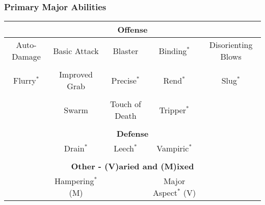 \subsubsection{Primary Major Abilities}
\begin{tabular}{|c c c c c|}
\hline
\multicolumn{5}{|c|}{\cellcolor{gray}\textbf{Offense}} \\
\hline
Auto-Damage & Basic Attack & Blaster & Binding$^\ast $  & Disorienting Blows \\
 & & & & \\
Flurry$^\ast $  & Improved Grab & Precise$^\ast $  & Rend$^\ast $  & Slug$^\ast $  \\
 & & & & \\
 & Swarm & Touch of Death & Tripper$^\ast $ & \\
\hline
\multicolumn{5}{c}{ }\\
\hline
\multicolumn{5}{|c|}{\cellcolor{gray}\textbf{Defense}} \\
\hline
 & Drain$^\ast $ & Leech$^\ast $ & Vampiric$^\ast $ & \\
\hline
\multicolumn{5}{c}{ }\\
\hline
\multicolumn{5}{|c|}{\cellcolor{gray}\textbf{Other - (V)aried and (M)ixed}} \\
\hline
 & Hampering$^\ast $ (M) & & Major Aspect$^\ast $ (V)  & \\
\hline
\end{tabular}



